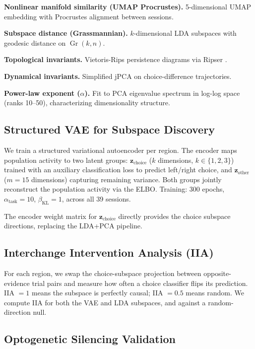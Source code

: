 \documentclass{article}
\begin{document}
\textbf{Nonlinear manifold similarity (UMAP Procrustes).} 5-dimensional UMAP embedding \citep{mcinnes2018umap} with Procrustes alignment between sessions.

\textbf{Subspace distance (Grassmannian).} $k$-dimensional LDA subspaces with geodesic distance on $\operatorname{Gr}(k, n)$.

\textbf{Topological invariants.} Vietoris-Rips persistence diagrams via Ripser \citep{bauer2021ripser}.

\textbf{Dynamical invariants.} Simplified jPCA on choice-difference trajectories.

\textbf{Power-law exponent ($\alpha$).} Fit to PCA eigenvalue spectrum in log-log space (ranks 10--50), characterizing dimensionality structure.

\subsection{Structured VAE for Subspace Discovery}

We train a structured variational autoencoder \citep{narayanaswamy2017learning} per region. The encoder maps population activity to two latent groups: $\mathbf{z}_{\text{choice}}$ ($k$ dimensions, $k \in \{1,2,3\}$) trained with an auxiliary classification loss to predict left/right choice, and $\mathbf{z}_{\text{other}}$ ($m = 15$ dimensions) capturing remaining variance. Both groups jointly reconstruct the population activity via the ELBO. Training: 300 epochs, $\alpha_{\text{task}} = 10$, $\beta_{\text{KL}} = 1$, across all 39 sessions.

The encoder weight matrix for $\mathbf{z}_{\text{choice}}$ directly provides the choice subspace directions, replacing the LDA+PCA pipeline.

\subsection{Interchange Intervention Analysis (IIA)}

For each region, we swap the choice-subspace projection between opposite-evidence trial pairs and measure how often a choice classifier flips its prediction. IIA $= 1$ means the subspace is perfectly causal; IIA $= 0.5$ means random. We compute IIA for both the VAE and LDA subspaces, and against a random-direction null.

\subsection{Optogenetic Silencing Validation}
\end{document}

